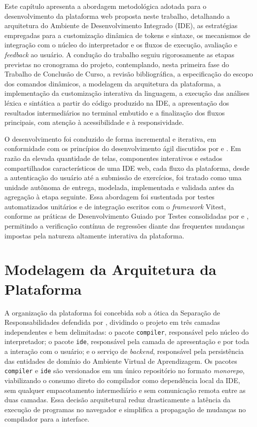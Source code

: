 
Este capítulo apresenta a abordagem metodológica adotada para o desenvolvimento da plataforma web proposta neste trabalho, detalhando a arquitetura do Ambiente de Desenvolvimento Integrado (IDE), as estratégias empregadas para a customização dinâmica de tokens e sintaxe, os mecanismos de integração com o núcleo do interpretador e os fluxos de execução, avaliação e \textit{feedback} ao usuário. A condução do trabalho seguiu rigorosamente as etapas previstas no cronograma do projeto, contemplando, nesta primeira fase do Trabalho de Conclusão de Curso, a revisão bibliográfica, a especificação do escopo dos comandos dinâmicos, a modelagem da arquitetura da plataforma, a implementação da customização interativa da linguagem, a execução das análises léxica e sintática a partir do código produzido na IDE, a apresentação dos resultados intermediários no terminal embutido e a finalização dos fluxos principais, com atenção à acessibilidade e à responsividade.

O desenvolvimento foi conduzido de forma incremental e iterativa, em conformidade com os princípios do desenvolvimento ágil discutidos por  e . Em razão da elevada quantidade de telas, componentes interativos e estados compartilhados característicos de uma IDE web, cada fluxo da plataforma, desde a autenticação do usuário até a submissão de exercícios, foi tratado como uma unidade autônoma de entrega, modelada, implementada e validada antes da agregação à etapa seguinte. Essa abordagem foi sustentada por testes automatizados unitários e de integração escritos com o \textit{framework} Vitest, conforme as práticas de Desenvolvimento Guiado por Testes consolidadas por  e , permitindo a verificação contínua de regressões diante das frequentes mudanças impostas pela natureza altamente interativa da plataforma.

\section{Modelagem da Arquitetura da Plataforma}
\label{sec:arquitetura-plataforma}

A organização da plataforma foi concebida sob a ótica da Separação de Responsabilidades defendida por , dividindo o projeto em três camadas independentes e bem delimitadas: o pacote \texttt{compiler}, responsável pelo núcleo do interpretador; o pacote \texttt{ide}, responsável pela camada de apresentação e por toda a interação com o usuário; e o serviço de \textit{backend}, responsável pela persistência das entidades de domínio do Ambiente Virtual de Aprendizagem. Os pacotes \texttt{compiler} e \texttt{ide} são versionados em um único repositório no formato \textit{monorepo}, viabilizando o consumo direto do compilador como dependência local da IDE, sem qualquer empacotamento intermediário e sem comunicação remota entre as duas camadas. Essa decisão arquitetural reduz drasticamente a latência da execução de programas no navegador e simplifica a propagação de mudanças no compilador para a interface.

